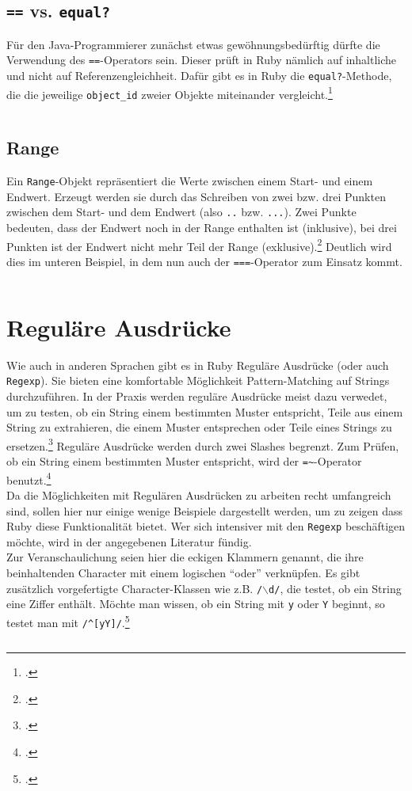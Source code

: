 \documentclass[a4paper, 11pt]{scrreprt}
\begin{document}
\subsection{\texttt{==} vs. \texttt{equal?}}
Für den Java-Programmierer zunächst etwas gewöhnungsbedürftig dürfte die Verwendung des \texttt{==}-Operators sein. Dieser prüft in Ruby nämlich auf inhaltliche und nicht auf Referenzengleichheit. Dafür gibt es in Ruby die \texttt{equal?}-Methode, die die jeweilige \texttt{object\_id} zweier Objekte miteinander vergleicht.\footcite[vgl.][S.76]{ruby_lang}
\inputminted[]{ruby}{equal.rb}

\subsection{Range}
Ein \texttt{Range}-Objekt repräsentiert die Werte zwischen einem Start- und einem Endwert. Erzeugt werden sie durch das Schreiben von zwei bzw. drei Punkten zwischen dem Start- und dem Endwert (also \texttt{..} bzw. \texttt{...}). Zwei Punkte bedeuten, dass der Endwert noch in der Range enthalten ist (inklusive), bei drei Punkten ist der Endwert nicht mehr Teil der Range (exklusive).\footcite[vgl.][S.68-70]{ruby_lang} 
Deutlich wird dies im unteren Beispiel, in dem nun auch der \texttt{===}-Operator zum Einsatz kommt.
\inputminted[]{ruby}{range.rb}

\section{Reguläre Ausdrücke}
Wie auch in anderen Sprachen gibt es in Ruby Reguläre Ausdrücke (oder auch \texttt{Regexp}). Sie bieten eine komfortable Möglichkeit Pattern-Matching auf Strings durchzuführen. In der Praxis werden reguläre Ausdrücke meist dazu verwedet, um zu testen, ob ein String einem bestimmten Muster entspricht, Teile aus einem String zu extrahieren, die einem Muster entsprechen oder Teile eines Strings zu ersetzen.\footcite[vgl.][S.99]{p_ruby}
Reguläre Ausdrücke werden durch zwei Slashes begrenzt. Zum Prüfen, ob ein String einem bestimmten Muster entspricht, wird der \texttt{=\~}-Operator benutzt.\footcite[vgl.][S.100]{p_ruby}\\
Da die Möglichkeiten mit Regulären Ausdrücken zu arbeiten recht umfangreich sind, sollen hier nur einige wenige Beispiele dargestellt werden, um zu zeigen dass Ruby diese Funktionalität bietet. Wer sich intensiver mit den \texttt{Regexp} beschäftigen möchte, wird in der angegebenen Literatur fündig.\\
Zur Veranschaulichung seien hier die eckigen Klammern genannt, die ihre beinhaltenden Character mit einem logischen ``oder'' verknüpfen. Es gibt zusätzlich vorgefertigte Character-Klassen wie z.B. \texttt{/$\backslash$d/}, die testet, ob ein String eine Ziffer enthält. Möchte man wissen, ob ein String mit \texttt{y} oder \texttt{Y} beginnt, so testet man mit \texttt{/\^{}[yY]/}.\footcite[vgl.][S.310-321]{ruby_lang}
\inputminted[]{ruby}{regexp1.rb}
\end{document}
